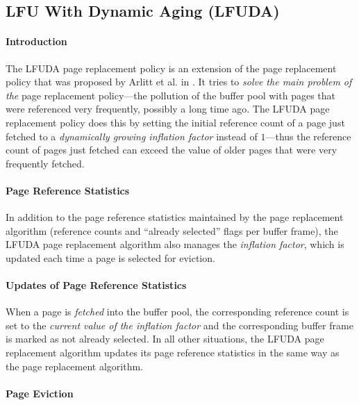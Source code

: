 \subsection[LFUDA]{LFU With Dynamic Aging (LFUDA)} \label{subsec:lfuda}

\paragraph{Introduction}

    The LFUDA page replacement policy is an extension of the  page replacement policy that was proposed by Arlitt et al. in \cite{Arlitt:2000-2}. It tries to \emph{solve the main problem of the } page replacement policy---the pollution of the buffer pool with pages that were referenced very frequently, possibly a long time ago. The LFUDA page replacement policy does this by setting the initial reference count of a page just fetched to a \emph{dynamically growing inflation factor} instead of $1$---thus the reference count of pages just fetched can exceed the value of older pages that were very frequently fetched.

\paragraph{Page Reference Statistics}

    In addition to the page reference statistics maintained by the  page replacement algorithm (reference counts and ``already selected'' flags per buffer frame), the LFUDA page replacement algorithm also manages the \emph{inflation factor}, which is updated each time a page is selected for eviction.

\paragraph{Updates of Page Reference Statistics}

    When a page is \emph{fetched} into the buffer pool, the corresponding reference count is set to the \emph{current value of the inflation factor} and the corresponding buffer frame is marked as not already selected. In all other situations, the LFUDA page replacement algorithm updates its page reference statistics in the same way as the  page replacement algorithm.

\paragraph{Page Eviction}

